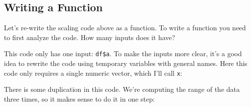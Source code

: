 \documentclass[]{book}
\newenvironment{Shaded}{\begin{snugshade}}{\end{snugshade}}
\newcommand{\CommentTok}[1]{\textcolor[rgb]{0.56,0.35,0.01}{\textit{#1}}}
\newcommand{\DataTypeTok}[1]{\textcolor[rgb]{0.13,0.29,0.53}{#1}}
\newcommand{\DecValTok}[1]{\textcolor[rgb]{0.00,0.00,0.81}{#1}}
\newcommand{\KeywordTok}[1]{\textcolor[rgb]{0.13,0.29,0.53}{\textbf{#1}}}
\newcommand{\NormalTok}[1]{#1}
\newcommand{\OperatorTok}[1]{\textcolor[rgb]{0.81,0.36,0.00}{\textbf{#1}}}
\newcommand{\StringTok}[1]{\textcolor[rgb]{0.31,0.60,0.02}{#1}}
\begin{document}
\hypertarget{writing-a-function}{%
\subsection{Writing a Function}\label{writing-a-function}}

Let's re-write the scaling code above as a function. To write a function you need to first analyze the code. How many inputs does it have?

\begin{Shaded}
\end{Shaded}

This code only has one input: \texttt{df\$a}. To make the inputs more clear, it's a good idea to rewrite the code using temporary variables with general names. Here this code only requires a single numeric vector, which I'll call \texttt{x}:

\begin{Shaded}
\end{Shaded}

There is some duplication in this code. We're computing the range of the data three times, so it makes sense to do it in one step:
\end{document}
